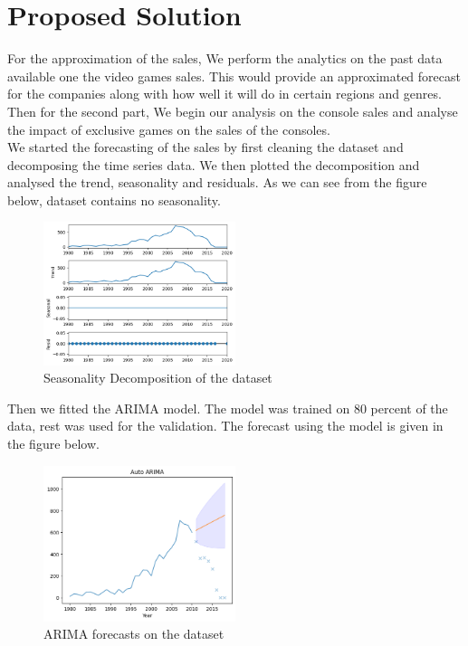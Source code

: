 \documentclass[conference]{IEEEtran}
\begin{document}
\section{Proposed Solution}
For the approximation of the sales, We perform the analytics on the past data available one the video games sales. This would provide an approximated forecast for the companies along with how well it will do in certain regions and genres. Then for the second part, We begin our analysis on the console sales and analyse the impact of exclusive games on the sales of the consoles. \\
We started the forecasting of the sales by first cleaning the dataset and decomposing the time series data. We then plotted the decomposition and analysed the trend, seasonality and residuals. As we can see from the figure below, dataset contains no seasonality.\\
\begin{figure}[h]
    \centering
    \includegraphics[width=0.5\textwidth]{decompose.png}
    \caption{Seasonality Decomposition of the dataset}
\end{figure}
Then we fitted the ARIMA model. The model was trained on 80 percent of the data, rest was used for the validation. The forecast using the model is given in the figure below.\\
\begin{figure}[h]
    \centering
    \includegraphics[width=0.5\textwidth]{before merge arima.png}
    \caption{ARIMA forecasts on the dataset}
\end{figure}
\end{document}
